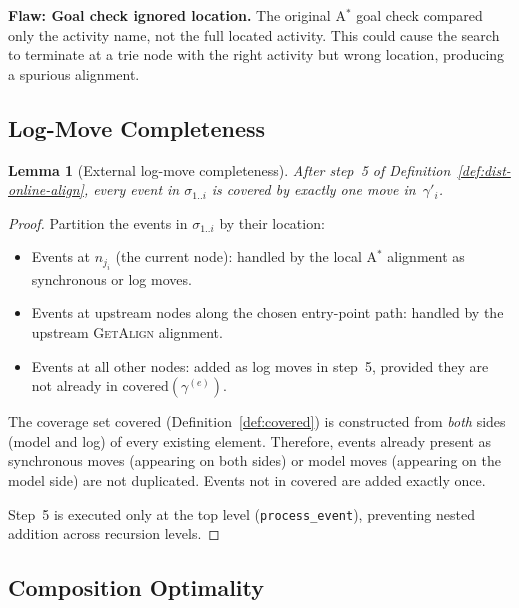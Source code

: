 \documentclass[11pt,a4paper]{article}
\newcommand{\new}[1]{{\color{Blue}#1}}         %
\newtheorem{lemma}{Lemma}
\newcommand{\alignment}{\gamma}
\newcommand{\trace}{\sigma}
\newcommand{\GA}{\textsc{GetAlign}}
\newcommand{\cov}{\mathrm{covered}}
\begin{document}
\begin{oldbox}
\textbf{Flaw: Goal check ignored location.}\;
The original A$^{*}$ goal check compared only the activity name, not
the full located activity.  This could cause the search to terminate
at a trie node with the right activity but wrong location, producing
a spurious alignment.
\end{oldbox}

\subsection{Log-Move Completeness}

\begin{lemma}[External log-move completeness]\label{lem:log-moves}
  After step~5 of Definition~\ref{def:dist-online-align},
  every event in $\trace_{1..i}$ is covered by exactly one move
  in~$\alignment'_i$.
\end{lemma}

\begin{proof}
  Partition the events in $\trace_{1..i}$ by their location:
  \begin{itemize}
    \item Events at $n_{j_i}$ (the current node): handled by the local
          A$^{*}$ alignment as synchronous or log moves.
    \item Events at upstream nodes along the chosen entry-point path:
          handled by the upstream \GA{} alignment.
    \item Events at all other nodes: added as log moves in step~5,
          provided they are not already in $\cov(\alignment^{(e)})$.
  \end{itemize}

  The coverage set $\cov$ (Definition~\ref{def:covered}) is
  constructed from \emph{both} sides (model and log) of every existing
  element.  Therefore, events already present as synchronous moves
  (appearing on both sides) or model moves (appearing on the model side)
  are not duplicated.
  Events not in $\cov$ are added exactly once.

  \new{Step~5 is executed only at the top level
  (\texttt{process\_event}), preventing nested addition across
  recursion levels.}
\end{proof}

\subsection{Composition Optimality}
\end{document}
